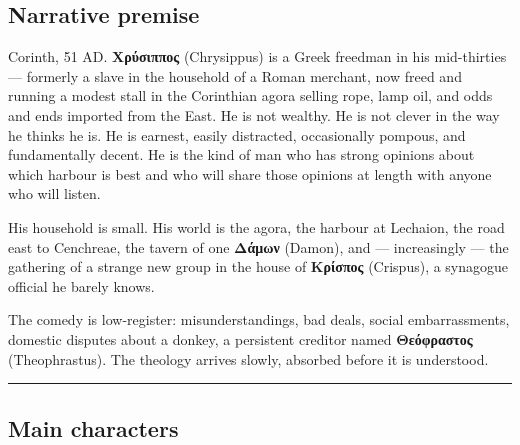 \documentclass[a4paper]{report}
\begin{document}
\subsection{Narrative premise}\label{narrative-premise}

Corinth, 51 AD. \textbf{Χρύσιππος} (Chrysippus) is a Greek freedman in
his mid-thirties --- formerly a slave in the household of a Roman
merchant, now freed and running a modest stall in the Corinthian agora
selling rope, lamp oil, and odds and ends imported from the East. He is
not wealthy. He is not clever in the way he thinks he is. He is earnest,
easily distracted, occasionally pompous, and fundamentally decent. He is
the kind of man who has strong opinions about which harbour is best and
who will share those opinions at length with anyone who will listen.

His household is small. His world is the agora, the harbour at Lechaion,
the road east to Cenchreae, the tavern of one \textbf{Δάμων} (Damon),
and --- increasingly --- the gathering of a strange new group in the
house of \textbf{Κρίσπος} (Crispus), a synagogue official he barely
knows.

The comedy is low-register: misunderstandings, bad deals, social
embarrassments, domestic disputes about a donkey, a persistent creditor
named \textbf{Θεόφραστος} (Theophrastus). The theology arrives slowly,
absorbed before it is understood.

\begin{center}\rule{0.5\linewidth}{0.5pt}\end{center}

\subsection{Main characters}\label{main-characters}
\end{document}
